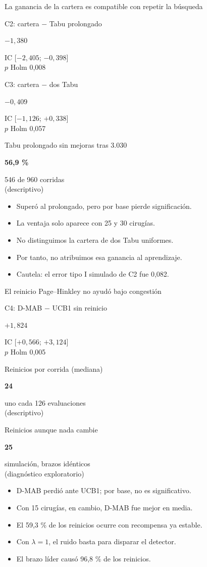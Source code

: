 \documentclass[aspectratio=169,11pt]{beamer}
\newcommand{\cifra}[3]{%
  \begin{minipage}[t]{0.31\textwidth}\centering
    {\scriptsize\color{gris}#1\par}\vspace{0.1cm}
    {\LARGE\bfseries\boldmath\color{azul}#2\par}\vspace{0.1cm}
    {\scriptsize #3\par}
  \end{minipage}}
\begin{document}
\begin{frame}{La ganancia de la cartera es compatible con repetir la búsqueda}
  \centering
  \cifra{C2: cartera $-$ Tabu prolongado}{$-1{,}380$}{IC [$-2{,}405$; $-0{,}398$]\\$p$ Holm 0,008}\hfill
  \cifra{C3: cartera $-$ dos Tabu}{$-0{,}409$}{IC [$-1{,}126$; $+0{,}338$]\\$p$ Holm 0,057}\hfill
  \cifra{Tabu prolongado sin mejoras tras 3.030}{56,9 \%}{546 de 960 corridas\\(descriptivo)}

  \vspace{0.4cm}
  \raggedright
  \begin{itemize}
    \item Superó al prolongado, pero por base pierde significación.
    \item La ventaja solo aparece con 25 y 30 cirugías.
    \item No distinguimos la cartera de dos Tabu uniformes.
    \item Por tanto, no atribuimos esa ganancia al aprendizaje.
    \item Cautela: el error tipo I simulado de C2 fue 0,082.
  \end{itemize}
\end{frame}

\begin{frame}{El reinicio Page--Hinkley no ayudó bajo congestión}
  \centering
  \cifra{C4: D-MAB $-$ UCB1 sin reinicio}{$+1{,}824$}{IC [$+0{,}566$; $+3{,}124$]\\$p$ Holm 0,005}\hfill
  \cifra{Reinicios por corrida (mediana)}{24}{uno cada 126 evaluaciones\\(descriptivo)}\hfill
  \cifra{Reinicios aunque nada cambie}{25}{simulación, brazos idénticos\\(diagnóstico exploratorio)}

  \vspace{0.4cm}
  \raggedright
  \begin{itemize}
    \item D-MAB perdió ante UCB1; por base, no es significativo.
    \item Con 15 cirugías, en cambio, D-MAB fue mejor en media.
    \item El 59,3 \% de los reinicios ocurre con recompensa ya estable.
    \item Con $\lambda=1$, el ruido basta para disparar el detector.
    \item El brazo líder causó 96,8 \% de los reinicios.
  \end{itemize}
\end{frame}
\end{document}
